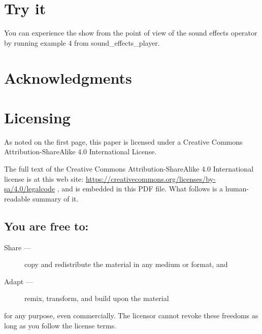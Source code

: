 \documentclass[letterpaper,twoside]{article}
\begin{document}
\section{Try it}
You can experience the show from the point of view of the sound
effects operator by running example 4 from sound\_effects\_player.
  
\section{Acknowledgments}
  
\newpage

\section{Licensing}
\label{section:Licensing}
As noted on the first page, this paper is licensed under a Creative
Commons Attribution-ShareAlike 4.0 International License.

The full text of the Creative Commons Attribution-ShareAlike 4.0
International license is at this web site:
\url{https://creativecommons.org/licenses/by-sa/4.0/legalcode}%
, and is embedded in this
PDF file.  What follows is a human-readable summary of it.

\subsection{You are free to:}
\begin{description}
\item[Share ---]copy and redistribute the material in any medium or format, and
\item[Adapt ---]remix, transform, and build upon the material
\end{description}
for any purpose, even commercially.  The licensor cannot revoke these
freedoms as long as you follow the license terms.
\end{document}
